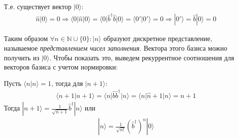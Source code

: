 \documentclass[__main__.tex]{subfiles}
\begin{document}
Т.е. существует вектор $|0\rangle$:
\begin{gather*}
	\hat{n}|0\rangle = 0
	\Longrightarrow
	\langle 0|\hat{n}|0\rangle = \langle 0|\hat{b}^\dagger\hat{b}|0\rangle = \langle 0'|0'\rangle = 0
	\Longrightarrow
	|0'\rangle = \hat{b}|0\rangle = 0
\end{gather*}

Таким образом $\forall n\in\mathbb{N}\cup\{0\}\colon|n\rangle$ образуют дискретное представление, называемое \textit{представлением чисел заполнения}. Вектора этого базиса можно получить из $|0\rangle$. Чтобы показать это, выведем рекуррентное соотношения для векторов базиса с учетом нормировки:

Пусть $\langle n|n\rangle=1$, тогда для $|n+1\rangle$:
\begin{gather*}
	\langle n+1|n+1\rangle = \langle n|\hat{b}\hat{b}^\dagger|n\rangle = \langle n|\hat{n}+1|n\rangle
	= n+1
\end{gather*}
Тогда $|n+1\rangle = \frac{1}{\sqrt{n+1}}\hat{b}^\dagger|n\rangle$ или
\begin{gather*}
	|n\rangle = \frac{1}{\sqrt{n!}}\left(\hat{b}^\dagger\right)^n|0\rangle
\end{gather*}
\end{document}
